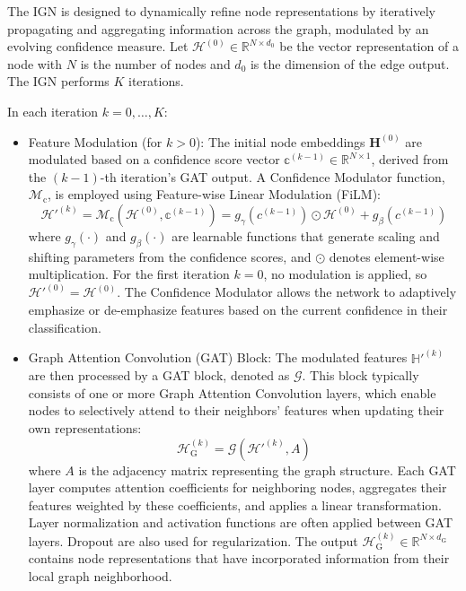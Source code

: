 The IGN is designed to dynamically refine node representations by iteratively propagating and aggregating information across the graph, modulated by an evolving confidence measure. Let \(\mathcal{H}^{(0)} \in \mathbb{R}^{N \times d_0}\) be the vector representation of a node with \(N\) is the number of nodes and \(d_0\) is the dimension of the edge output. The IGN performs \(K\) iterations.

In each iteration \(k = 0, \dots, K\):
\begin{itemize}
  \item Feature Modulation (for \(k > 0\)):
    The initial node embeddings $\mathbf{H}^{(0)}$ are modulated based on a confidence score vector \(\mathbb{c}^{(k-1)} \in \mathbb{R}^{N \times 1}\), derived from the \((k-1)\)-th iteration's GAT output. A Confidence Modulator function, $\mathcal{M}_{\text{c}}$, is employed using Feature-wise Linear Modulation (FiLM):
    \begin{equation}
      \mathcal{H}'^{(k)} = \mathcal{M}_{\text{c}}(\mathcal{H}^{(0)}, \mathbb{c}^{(k-1)}) = g_{\gamma}(c^{(k-1)}) \odot \mathcal{H}^{(0)} + g_{\beta}(c^{(k-1)})
    \end{equation}
    where \(g_{\gamma}(\cdot)\) and \(g_{\beta}(\cdot)\) are learnable functions that generate scaling and shifting parameters from the confidence scores, and \(\odot\) denotes element-wise multiplication. For the first iteration \(k=0\), no modulation is applied, so \(\mathcal{H}'^{(0)} = \mathcal{H}^{(0)}\). The Confidence Modulator allows the network to adaptively emphasize or de-emphasize features based on the current confidence in their classification.

  \item Graph Attention Convolution (GAT) Block:
    The modulated features \(\mathbb{H}'^{(k)}\) are then processed by a GAT block, denoted as \(\mathcal{G}\). This block typically consists of one or more Graph Attention Convolution layers, which enable nodes to selectively attend to their neighbors' features when updating their own representations:
    \begin{equation}
      \mathcal{H}_{\text{G}}^{(k)} = \mathcal{G}(\mathcal{H}'^{(k)}, A)
    \end{equation}
    where \(A\) is the adjacency matrix representing the graph structure. Each GAT layer computes attention coefficients for neighboring nodes, aggregates their features weighted by these coefficients, and applies a linear transformation. Layer normalization and activation functions  are often applied between GAT layers. Dropout are also used for regularization. The output \(\mathcal{H}_{\text{G}}^{(k)} \in \mathbb{R}^{N \times d_{\text{G}}}\) contains node representations that have incorporated information from their local graph neighborhood.


\end{itemize}
